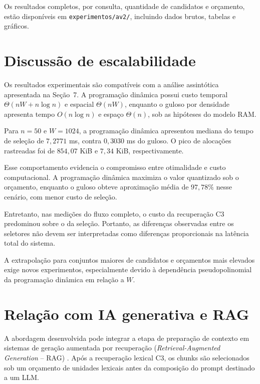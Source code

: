 \documentclass[11pt,a4paper]{article}
\theoremstyle{plain}
\theoremstyle{definition}
\theoremstyle{plain}
\begin{document}
Os resultados completos, por consulta,
quantidade de candidatos e orçamento, estão
disponíveis em \texttt{experimentos/av2/},
incluindo dados brutos, tabelas e gráficos.

\section{Discussão de escalabilidade}

Os resultados experimentais são compatíveis
com a análise assintótica apresentada na
Seção~7. A programação dinâmica possui custo
temporal $\Theta(nW+n\log n)$ e espacial
$\Theta(nW)$, enquanto o guloso por densidade
apresenta tempo $O(n\log n)$ e espaço
$\Theta(n)$, sob as hipóteses do modelo RAM.

Para $n=50$ e $W=1024$, a programação dinâmica
apresentou mediana do tempo de seleção de
$7{,}2771$ ms, contra $0{,}3030$ ms do guloso.
O pico de alocações rastreadas foi de
$854{,}07$ KiB e $7{,}34$ KiB, respectivamente.

Esse comportamento evidencia o compromisso
entre otimalidade e custo computacional.
A programação dinâmica maximiza o valor
quantizado sob o orçamento, enquanto o guloso
obteve aproximação média de $97{,}78\%$
nesse cenário, com menor custo de seleção.

Entretanto, nas medições do fluxo completo,
o custo da recuperação C3 predominou sobre
o da seleção. Portanto, as diferenças
observadas entre os seletores não devem ser
interpretadas como diferenças proporcionais
na latência total do sistema.

A extrapolação para conjuntos maiores de
candidatos e orçamentos mais elevados exige
novos experimentos, especialmente devido
à dependência pseudopolinomial da programação
dinâmica em relação a $W$.



\section{Relação com IA generativa e RAG}

A abordagem desenvolvida pode integrar a etapa
de preparação de contexto em sistemas de geração
aumentada por recuperação
(\emph{Retrieval-Augmented Generation} -- RAG)
\cite{lewis2020retrieval}. Após a recuperação
lexical C3, os chunks são selecionados sob
um orçamento de unidades lexicais antes da
composição do prompt destinado a um LLM.
\end{document}
